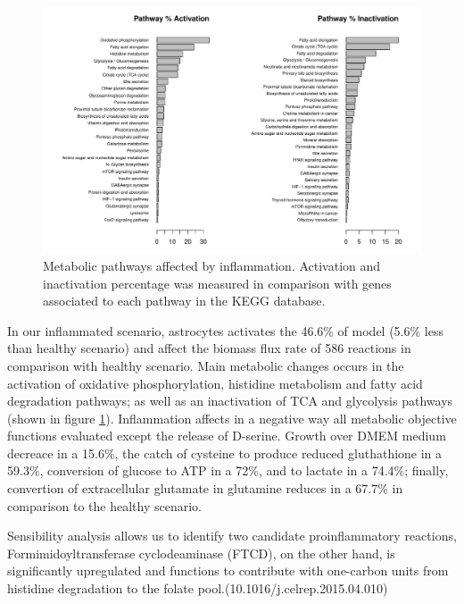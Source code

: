 \begin{figure}[h]
\begin{center}
\includegraphics[width=\textwidth]{neuroprotective/Healthy2Inflammated}
\end{center}
\caption{Metabolic pathways affected by inflammation. Activation and inactivation percentage was measured in comparison with genes associated to each pathway in the KEGG database.}
\label{h2i}
\end{figure}

In our inflammated scenario, astrocytes activates the 46.6\% of model (5.6\% less than healthy scenario) and affect the biomass flux rate of 586 reactions in comparison with healthy scenario. Main metabolic changes occurs in the activation of oxidative phosphorylation, histidine metabolism and fatty acid degradation pathways; as well as an inactivation of TCA and glycolysis pathways (shown in figure \ref{h2i}). Inflammation affects in a negative way all metabolic objective functions evaluated except the release of D-serine. Growth over DMEM medium decreace in a  15.6\%, the catch of cysteine to produce reduced gluthathione in a 59.3\%, conversion of glucose to ATP in a 72\%, and to lactate in a 74.4\%; finally, convertion of extracellular glutamate in glutamine reduces in a 67.7\% in comparison to the healthy scenario.

Sensibility analysis allows us to identify two candidate proinflammatory reactions, Formimidoyltransferase cyclodeaminase (FTCD), on the other hand, is significantly upregulated and functions to contribute with one-carbon units from histidine degradation to the folate pool.(10.1016/j.celrep.2015.04.010)

